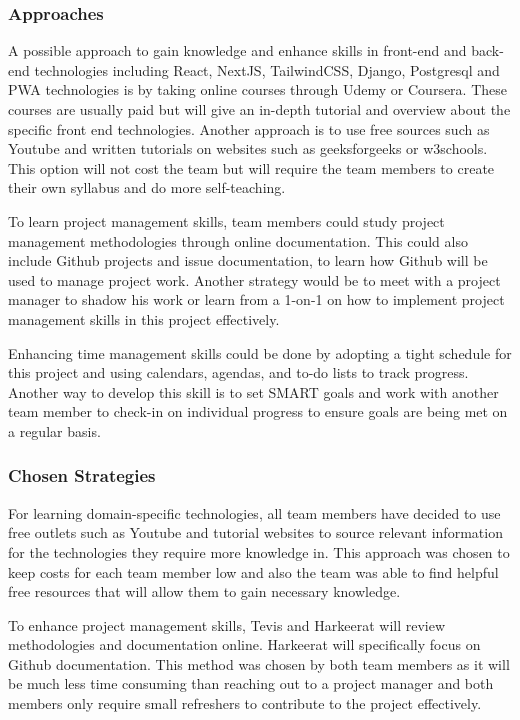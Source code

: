 \documentclass[12pt]{article}
\begin{document}
\subsubsection{Approaches}
A possible approach to gain knowledge and enhance skills in front-end and back-end technologies including React, NextJS, TailwindCSS, Django, Postgresql and PWA technologies is by taking online courses through Udemy or Coursera. These courses are usually paid but will give an in-depth tutorial and overview about the specific front end technologies. Another approach is to use free sources such as Youtube and written tutorials on websites such as geeksforgeeks or w3schools. This option will not cost the team but will require the team members to create their own syllabus and do more self-teaching. 

To learn project management skills, team members could study project management methodologies through online documentation. This could also include Github projects and issue documentation, to learn how Github will be used to manage project work. Another strategy would be to meet with a project manager to shadow his work or learn from a 1-on-1 on how to implement project management skills in this project effectively.

Enhancing time management skills could be done by adopting a tight schedule for this project and using calendars, agendas, and to-do lists to track progress. Another way to develop this skill is to set SMART goals and work with another team member to check-in on individual progress to ensure goals are being met on a regular basis.

\subsubsection{Chosen Strategies}
For learning domain-specific technologies, all team members have decided to use free outlets such as Youtube and tutorial websites to source relevant information for the technologies they require more knowledge in. This approach was chosen to keep costs for each team member low and also the team was able to find helpful free resources that will allow them to gain necessary knowledge.

To enhance project management skills, Tevis and Harkeerat will review methodologies and documentation online. Harkeerat will specifically focus on Github documentation. This method was chosen by both team members as it will be much less time consuming than reaching out to a project manager and both members only require small refreshers to contribute to the project effectively.
\end{document}
